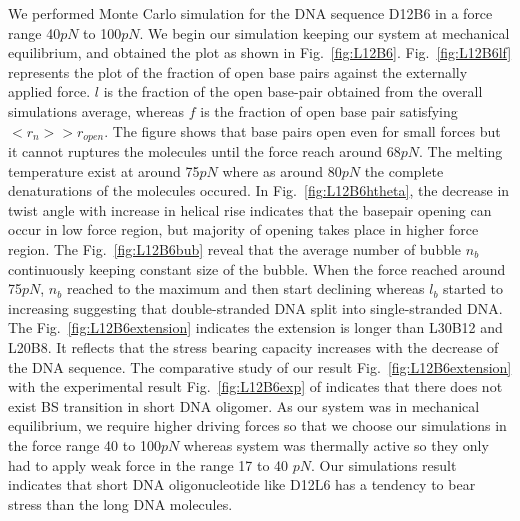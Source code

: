 \documentclass[12pt,masters,final]{UTRGVthesis}
\begin{document}
 We performed Monte Carlo simulation for the DNA sequence D12B6 in a force range 40$pN$ to 100$pN$. We begin our simulation keeping our system at mechanical equilibrium, and obtained the plot as shown in Fig.~\ref{fig:L12B6}. Fig.~\ref{fig:L12B6lf} represents the plot of the fraction of open base pairs against the externally applied force. $l$ is the fraction of the open base-pair obtained from the overall simulations average, whereas $f$ is the fraction of open base pair satisfying  $<r_{n}> > r_{open}$. The figure shows that base pairs open even for small forces but it cannot ruptures the molecules until the force reach around 68$pN$. The melting temperature exist at around 75$pN$ where as around 80$pN$ the complete denaturations of the molecules occured. In Fig.~\ref{fig:L12B6htheta}, the decrease in twist angle with increase in helical rise indicates that the basepair opening can occur in low force region, but majority of opening takes place in higher force region. The Fig.~\ref{fig:L12B6bub} reveal that the average number of bubble $n_{b}$ continuously keeping constant size of the bubble. When the force reached around  75$pN$, $n_{b}$ reached to the maximum and then start declining whereas $l_{b}$ started to increasing  suggesting that double-stranded DNA split into single-stranded DNA. The Fig.~\ref{fig:L12B6extension} indicates the extension is longer than L30B12 and L20B8. It reflects that the stress bearing capacity increases with the decrease of the DNA sequence. The comparative study of our result Fig.~\ref{fig:L12B6extension} with the experimental result Fig.~\ref{fig:L12B6exp} of \cite{Pope:2001}  indicates that there does not exist BS transition in short DNA oligomer. As our system was in mechanical equilibrium, we require higher driving forces so that we choose our simulations in the force range 40 to 100$pN$ whereas \cite{Pope:2001} system was thermally active so they only had to apply weak force in the range 17 to 40 $pN$. Our simulations result indicates that short DNA oligonucleotide like D12L6 has a tendency to bear stress than the long DNA molecules.
%
\newpage
\end{document}
